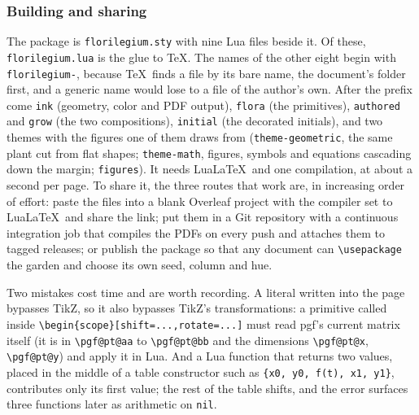 \subsubsection{Building and sharing}

The package is \texttt{florilegium.sty} with nine Lua files beside it. Of these,
\texttt{florilegium.lua} is the glue to \TeX. The names of the other eight begin with
\texttt{florilegium-}, because \TeX\ finds a file by its bare name, the document's folder
first, and a generic name would lose to a file of the author's own. After the prefix come
\texttt{ink} (geometry, color and PDF output), \texttt{flora}
(the primitives), \texttt{authored} and \texttt{grow} (the two compositions),
\texttt{initial} (the decorated initials), and two themes with the figures one of them
draws from (\texttt{theme-geometric}, the same plant cut from flat shapes;
\texttt{theme-math}, figures, symbols and equations cascading down the margin;
\texttt{figures}). It needs Lua\LaTeX\ and one compilation, at
about a second per page. To share it, the three routes that work are, in increasing order
of effort: paste the files into a blank Overleaf project with the compiler set to
Lua\LaTeX\ and share the link; put them in a Git repository with a continuous integration
job that compiles the PDFs on every push and attaches them to tagged releases; or publish
the package so that any document can \texttt{\textbackslash usepackage} the garden and
choose its own seed, column and hue.

\begin{remark}
Two mistakes cost time and are worth recording. A literal written into the page bypasses
TikZ, so it also bypasses TikZ's transformations: a primitive called inside
\verb|\begin{scope}[shift=...,rotate=...]| must read pgf's current matrix itself (it is in
\verb|\pgf@pt@aa| to \verb|\pgf@pt@bb| and the dimensions \verb|\pgf@pt@x|,
\verb|\pgf@pt@y|) and apply it in Lua. And a Lua function that returns two values, placed
in the middle of a table constructor such as \verb|{x0, y0, f(t), x1, y1}|, contributes only
its first value; the rest of the table shifts, and the error surfaces three functions
later as arithmetic on \texttt{nil}.
\end{remark}
